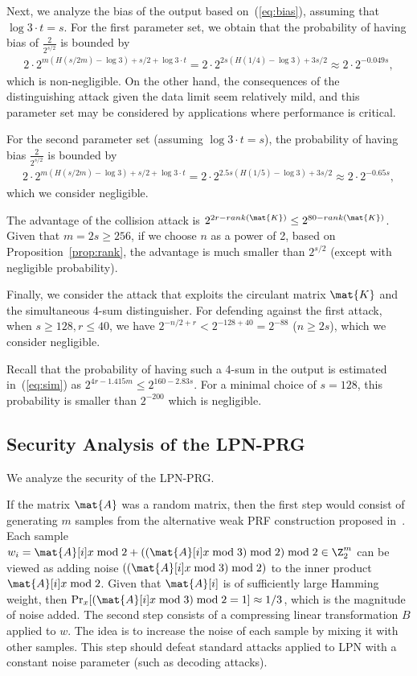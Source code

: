 Next, we analyze the bias of the output based on~(\ref{eq:bias}),
assuming that $\log 3 \cdot t = s$.
For the first parameter set,
we obtain that the probability of having bias of $\tfrac{2}{2^{s/2}}$ is bounded by
\begin{align*}
2 \cdot 2^{m (H(s/2m) - \log 3) + s/2 + \log 3 \cdot t} =
2 \cdot 2^{2s (H(1/4) - \log 3) + 3s/2} \approx
2 \cdot 2^{-0.049s},
\end{align*}
which is non-negligible.
On the other hand, the consequences of the distinguishing attack given the data limit
seem relatively mild, and this parameter set may be considered by applications
where performance is critical.

For the second parameter set (assuming $\log 3 \cdot t = s$),
the probability of having bias $\tfrac{2}{2^{s/2}}$ is bounded by
\begin{align*}
2 \cdot 2^{m (H(s/2m) - \log 3) + s/2 + \log 3 \cdot t} =
2 \cdot 2^{2.5s (H(1/5) - \log 3) + 3s/2} \approx
2 \cdot 2^{-0.65s},
\end{align*}
which we consider negligible.

The advantage of the collision attack is $2^{2r - rank(\mat{K})} \leq 2^{80 - rank(\mat{K})}$.
Given that $m = 2s \geq 256$, if we choose $n$ as a power of 2,
based on Proposition~\ref{prop:rank},
the advantage is much smaller than $2^{s/2}$ (except with negligible probability).

Finally, we consider the attack that exploits the circulant matrix $\mat{K}$
and the simultaneous 4-sum distinguisher.
For defending against the first attack,
when $s \geq 128, r \leq 40$, we have $2^{-n/2 + r} < 2^{-128 + 40} = 2^{-88}$ ($n \geq 2s$),
which we consider negligible.

Recall that the probability of having such a 4-sum in the output is estimated
in~(\ref{eq:sim}) as $2^{4r - 1.415 m} \leq 2^{160 - 2.83s}$.
For a minimal choice of $s = 128$, this probability is smaller than $2^{-200}$
which is negligible.



\subsection{Security Analysis of the LPN-PRG}

We analyze the security of the LPN-PRG.

If the matrix $\mat{A}$ was a random matrix, then
the first step would consist of generating $m$ samples from the alternative weak PRF construction proposed
in~\cite{boneh2018-darkmatter}. Each sample
$w_i = \mat{A}[i] x \bmod 2 + ((\mat{A}[i] x \bmod 3) \bmod 2) \bmod 2 \in \Z_2^m$
can be viewed as adding noise $((\mat{A}[i] x \bmod 3) \bmod 2)$ to the inner product $\mat{A}[i] x \bmod 2$.
Given that $\mat{A}[i]$ is of sufficiently large Hamming weight, then
$\Pr_x[(\mat{A}[i] x \bmod 3) \bmod 2 = 1] \approx 1/3$, which is the magnitude of noise added.
The second step consists of a compressing linear transformation $B$ applied to $w$.
The idea is to increase the noise of each sample by mixing it with other samples.
This step should defeat standard attacks applied to LPN with a constant noise parameter
(such as decoding attacks).

